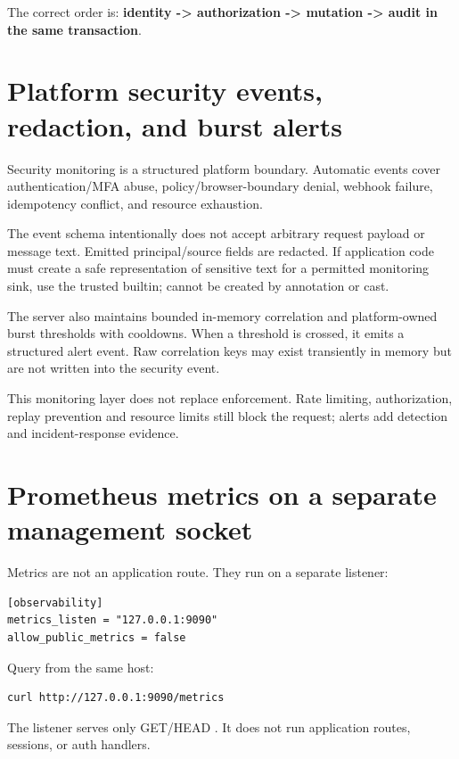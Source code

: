The correct order is: \textbf{identity -> authorization -> mutation -> audit in the same transaction}.

\section{Platform security events, redaction, and burst alerts}

Security monitoring is a structured platform boundary. Automatic events cover authentication/MFA abuse, policy/browser-boundary denial, webhook failure, idempotency conflict, and resource exhaustion.

The event schema intentionally does not accept arbitrary request payload or message text. Emitted principal/source fields are redacted. If application code must create a safe representation of sensitive text for a permitted monitoring sink, use the trusted  builtin;  cannot be created by annotation or cast.

The server also maintains bounded in-memory correlation and platform-owned burst thresholds with cooldowns. When a threshold is crossed, it emits a structured  alert event. Raw correlation keys may exist transiently in memory but are not written into the security event.

This monitoring layer does not replace enforcement. Rate limiting, authorization, replay prevention and resource limits still block the request; alerts add detection and incident-response evidence.

\section{Prometheus metrics on a separate management socket}

Metrics are not an application route. They run on a separate listener:

\begin{lstlisting}
[observability]
metrics_listen = "127.0.0.1:9090"
allow_public_metrics = false
\end{lstlisting}

Query from the same host:

\begin{lstlisting}
curl http://127.0.0.1:9090/metrics
\end{lstlisting}

The listener serves only GET/HEAD . It does not run application routes, sessions, or auth handlers.

